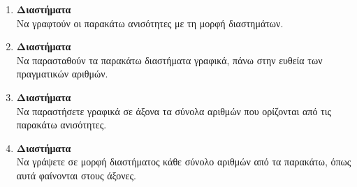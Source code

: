 \documentclass[twoside,nofonts,internet]{askhseis}
\begin{document}
\begin{enumerate}
\begin{multicols}{3}
\begin{rlist}
\end{rlist}
\end{multicols}
\item \textbf{Διαστήματα}\\
Να γραφτούν οι παρακάτω ανισότητες με τη μορφή διαστημάτων.
\begin{multicols}{2}
\end{multicols}
\item \textbf{Διαστήματα}\\
Να παρασταθούν τα παρακάτω διαστήματα γραφικά, πάνω στην ευθεία των πραγματικών αριθμών.
\begin{multicols}{3}
\begin{rlist}[leftmargin=5mm]
\item $ [-2,2] $
\item $ [4,9) $
\item $ (-3,0] $
\item $ (4,+\infty) $
\item $ (-\infty,3] $
\item $ (-4,5) $
\end{rlist}
\end{multicols}
\item \textbf{Διαστήματα}\\
Να παραστήσετε γραφικά σε άξονα τα σύνολα αριθμών που ορίζονται από τις παρακάτω ανισότητες.
\begin{multicols}{3}
\end{multicols}
\item \textbf{Διαστήματα}\\
Να γράψετε σε μορφή διαστήματος κάθε σύνολο αριθμών από τα παρακάτω, όπως αυτά φαίνονται στους άξονες.

\end{enumerate}
\end{document}
